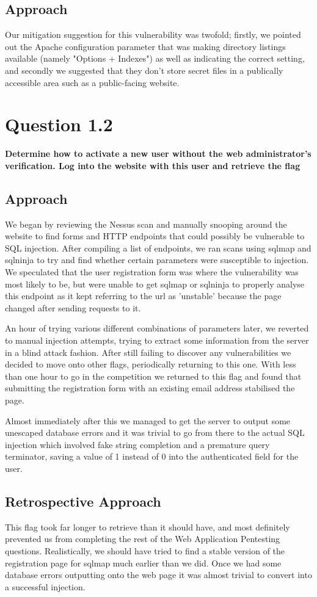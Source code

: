 \subsection{Approach}
Our mitigation suggestion for this vulnerability was twofold; firstly, we pointed
out the Apache configuration parameter that was making directory listings
available (namely "Options + Indexes") as well as indicating the correct
setting, and secondly we suggested that they don't store secret files in a
publically accessible area such as a public-facing website.

\section{Question 1.2}
\textbf{Determine how to activate a new user without the web administrator's
verification. Log into the website with this user and retrieve the flag}
\subsection{Approach}
We began by reviewing the Nessus scan and manually snooping around the website
to find forms and HTTP endpoints that could possibly be vulnerable to SQL
injection. After compiling a list of endpoints, we ran scans using sqlmap and
sqlninja to try and find whether certain parameters were susceptible to
injection. We speculated that the user registration form was where the
vulnerability was most likely to be, but were unable to get sqlmap or sqlninja
to properly analyse this endpoint as it kept referring to the url as 'unstable'
because the page changed after sending requests to it.

An hour of trying various different combinations of parameters later, we
reverted to manual injection attempts, trying to extract some information from
the server in a blind attack fashion. After still failing to discover any
vulnerabilities we decided to move onto other flags, periodically returning to
this one. With less than one hour to go in the competition we returned to this
flag and found that submitting the registration form with an existing email
address stabilised the page.

Almost immediately after this we managed to get the server to output some
unescaped database errors and it was trivial to go from there to the actual SQL
injection which involved fake string completion and a premature query
terminator, saving a value of 1 instead of 0 into the authenticated field for
the user.
\subsection{Retrospective Approach}
This flag took far longer to retrieve than it should have, and most definitely
prevented us from completing the rest of the Web Application Pentesting
questions. Realistically, we should have tried to find a stable version of the
registration page for sqlmap much earlier than we did. Once we had some database
errors outputting onto the web page it was almost trivial to convert into a
successful injection.

